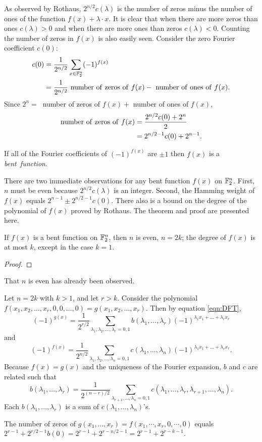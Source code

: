 \par As observed by Rothaus, $2^{n/2}c(\lambda)$ is the number of zeros minus the number
of ones of the function $f(x)+\lambda\cdot x$. It is clear that when there are more
zeros than ones $c(\lambda)>0$ and when there are more ones than zeros $c(\lambda)<0$.
Counting the number of zeros in $f(x)$ is also easily seen. Consider the zero Fourier
coefficient $c(0)$:
\begin{align*}
	c(0)&=\frac{1}{2^{n/2}}\sum_{x\in\gftwo^n}(-1)^{f(x)}\\
	&=\frac{1}{2^{n/2}}{\rm \ number\ of\ zeros\ of\ }f(x)-{\rm \ number\ of \ ones\ of \ }f(x).
\end{align*}
Since $2^n=\ $ number of zeros of $f(x)+$ number of ones of $f(x)$,
\begin{align*}
	{\rm number\ of\ zeros\ of\ }f(x)&=\frac{2^{n/2}c(0)+2^n}{2}\\
	                                 &=2^{n/2-1}c(0)+2^{n-1}.
\end{align*}

\begin{definition}\label{def:bent-function}
  If all of the Fourier coefficients of $(-1)^{f(x)}$ are $\pm1$ then
  $f(x)$ is a {\em bent\ function}.
\end{definition}

\par There are two immediate observations for any bent function $f(x)$ on $\mathbb{F}_2^n$.
First, $n$ must be even because $2^{n/2}c(\lambda)$ is an integer. Second, the Hamming
weight of $f(x)$ equals $2^{n-1}\pm2^{n/2-1}c(0)$. There also is a bound on the degree
of the polynomial of $f(x)$ proved by Rothaus. The theorem and proof are presented here.

\begin{theorem}\label{thm:deg-of-bent-function}
	If $f(x)$ is a bent function on $\mathbb{F}_2^n$, then $n$ is even, $n=2k$;
	the degree of $f(x)$ is at most $k$, except in the case $k=1$.
\end{theorem}
\begin{proof}
\end{proof}
\par That $n$ is even has already been observed.
\par Let $n=2k$ with $k>1$, and let $r>k$. Consider the polynomial
$f(x_1,x_2,\dots,x_r,0,0,\dots,0)=g(x_1,x_2,\dots,x_r)$. Then by equation \ref{eqn:DFT},
\[
	(-1)^{g(x)}=\frac{1}{2^{r/2}}\sum_{\lambda_1,\lambda_2,\dots,\lambda_r=0,1}b(\lambda_1,\dots,\lambda_r)(-1)^{\lambda_1x_1+\dots+\lambda_rx_r}
\]
and
\[
	(-1)^{f(x)}=\frac{1}{2^{n/2}}\sum_{\lambda_1,\lambda_2,\dots,\lambda_n=0,1}c(\lambda_1,\dots,\lambda_n)(-1)^{\lambda_1x_1+\dots+\lambda_rx_r}.
\]
Because $f(x)=g(x)$ and the uniqueness of the Fourier expansion, $b$ and $c$ are related such that
\[
b(\lambda_1,\dots,\lambda_r)=\frac{1}{2^{(n-r)/2}}\sum_{\lambda_{r+1},\dots,\lambda_n=0,1}c(\lambda_1,\dots,\lambda_r,\lambda_{r+1},\dots,\lambda_n).
\]
Each $b(\lambda_1,\dots,\lambda_r)$ is a sum of $c(\lambda_1,\dots,\lambda_n)$'s.
\par The number of zeros of $g(x_1,\dots,x_r)=f(x_1,\cdots,x_r,0,\cdots,0)$
equals $2^{r-1}+2^{r/2-1}b(0)=2^{r-1}+2^{r-n/2-1}=2^{r-1}+2^{r-k-1}$.

